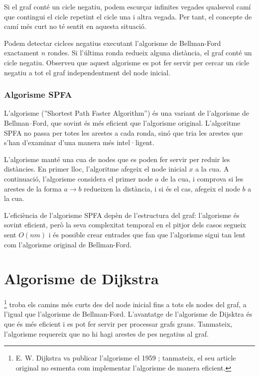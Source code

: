 Si el graf conté un cicle negatiu, podem escurçar infinites vegades
qualsevol camí que contingui el cicle repetint el cicle una i altra
vegada. Per tant, el concepte de camí més curt no té sentit en aquesta
situació.

Podem detectar ciclces negatius executant l'algorisme de Bellman-Ford
exactament $n$ rondes. Si l'última ronda redueix alguna distància, el
graf conté un cicle negatiu. Observeu que aquest algorisme es pot fer
servir per cercar un cicle negatiu a tot el graf independentment del
node inicial.

\subsubsection{Algorisme SPFA}


L'algorisme  (''Shortest Path Faster Algorithm'')
\cite{fan94} és una variant de l'algorisme de Bellman–Ford, que sovint
és més eficient que l'algorisme original. L'algoritme SPFA no passa
per totes les arestes a cada ronda, sinó que tria les arestes que
s'han d'examinar d'una manera més intel·ligent.

L'algorisme manté una cua de nodes que es poden fer servir per reduir
les distàncies. En primer lloc, l'algoritme afegeix el node inicial
$x$ a la cua. A continuació, l'algorisme considera el primer node $a$
de la cua, i comprova si les arestes de la forma $a \rightarrow b$
redueixen la distància, i si és el cas, afegeix el node $b$ a la cua.

L'eficiència de l'algorisme SPFA depèn de l'estructura del graf:
l'algorisme és sovint eficient, però la seva complexitat temporal en
el pitjor dels casos segueix sent $O(nm)$ i és possible crear entrades
que fan que l'algorisme sigui tan lent com l'algorisme original de
Bellman-Ford.

\section{Algorisme de Dijkstra}


\footnote{E. W. Dijkstra va publicar
l'algorisme el 1959 \cite{dij59}; tanmateix, el seu article original
no esmenta com implementar l'algorisme de manera eficient.} troba els
camins més curts des del node inicial fins a tots els nodes del graf,
a l'igual que l'algorisme de Bellman-Ford. L'avantatge de l'algorisme de
Dijsktra és que és més eficient i es pot fer servir per processar grafs
grans. Tanmateix, l'algorisme requereix que no hi hagi arestes de pes
negatius al graf.

